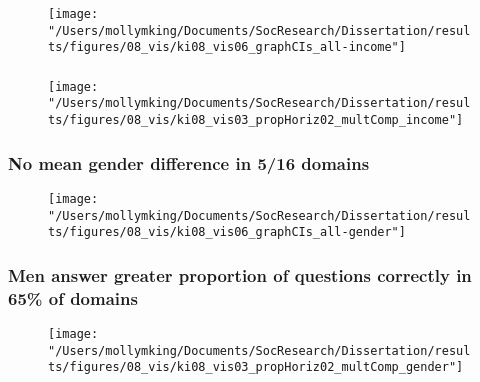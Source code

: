 \documentclass[pdf]{beamer}
\begin{document}
\begin{frame}
\frametitle{}
  \begin{figure}[ht]
    \begin{center}
    \texttt{[image: "/Users/mollymking/Documents/SocResearch/Dissertation/results/figures/08\_vis/ki08\_vis06\_graphCIs\_all-income"]}
    \end{center}
  \end{figure}

\end{frame}


\begin{frame}
\frametitle{}
  \begin{figure}[ht]
    \begin{center}
    \texttt{[image: "/Users/mollymking/Documents/SocResearch/Dissertation/results/figures/08\_vis/ki08\_vis03\_propHoriz02\_multComp\_income"]}
    \end{center}
  \end{figure}
\end{frame}


\begin{frame}
\frametitle{No mean gender difference in 5/16 domains}
  \begin{figure}[ht]
    \begin{center}
      \texttt{[image: "/Users/mollymking/Documents/SocResearch/Dissertation/results/figures/08\_vis/ki08\_vis06\_graphCIs\_all-gender"]}
    \end{center}
  \end{figure}
\end{frame}


\begin{frame}
\frametitle{Men answer greater proportion of questions correctly in 65\% of domains}
  \begin{figure}[ht]
    \begin{center}
      \texttt{[image: "/Users/mollymking/Documents/SocResearch/Dissertation/results/figures/08\_vis/ki08\_vis03\_propHoriz02\_multComp\_gender"]}
    \end{center}
  \end{figure}
\end{frame}
\end{document}
